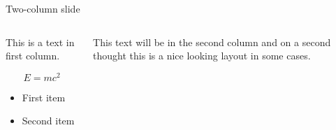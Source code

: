 \documentclass{ibeamer}
\begin{document}
\begin{frame}{Two-column slide}
  \begin{columns}
    \begin{column}{0.5 \linewidth}
      This is a text in first column.

      \begin{equation*}
        E = m c^2
      \end{equation*}

      \begin{itemize}
        \item First item
        \item Second item
      \end{itemize}
    \end{column}
    \begin{column}{0.5 \linewidth}
      This text will be in the second column and on a second thought this is a nice looking layout in some cases.
    \end{column}
  \end{columns}
\end{frame}
\end{document}
